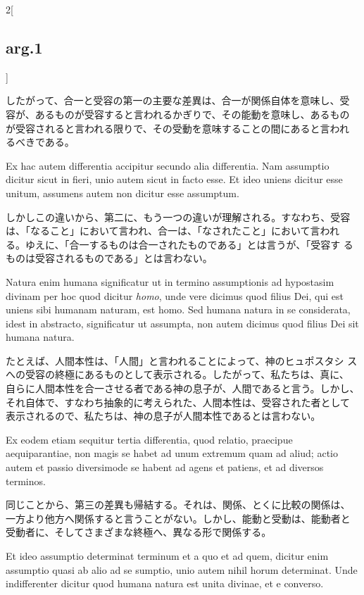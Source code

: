 \documentclass[paper=a4paper,fontsize=10pt,jafontsize=9pt,titlepage]{jlreq}
\begin{document}
\begin{paracol}{2}[\subsection{arg.1}]
\switchcolumn

したがって、合一と受容の第一の主要な差異は、合一が関係自体を意味し、受
容が、あるものが受容すると言われるかぎりで、その能動を意味し、あるもの
が受容されると言われる限りで、その受動を意味することの間にあると言われ
るべきである。

\switchcolumn*

Ex hac autem differentia accipitur secundo alia differentia. Nam
assumptio dicitur sicut in fieri, unio autem sicut in facto esse. Et
ideo uniens dicitur esse unitum, assumens autem non dicitur esse
assumptum.

\switchcolumn

しかしこの違いから、第二に、もう一つの違いが理解される。すなわち、受容
は、「なること」において言われ、合一は、「なされたこと」において言われ
る。ゆえに、「合一するものは合一されたものである」とは言うが、「受容す
るものは受容されるものである」とは言わない。

\switchcolumn*

Natura enim humana significatur ut in termino assumptionis ad
hypostasim divinam per hoc quod dicitur {\itshape homo}, unde vere
dicimus quod filius Dei, qui est uniens sibi humanam naturam, est
homo. Sed humana natura in se considerata, idest in abstracto,
significatur ut assumpta, non autem dicimus quod filius Dei sit humana
natura.

\switchcolumn

たとえば、人間本性は、「人間」と言われることによって、神のヒュポスタシ
スへの受容の終極にあるものとして表示される。したがって、私たちは、真に、
自らに人間本性を合一させる者である神の息子が、人間であると言う。しかし、
それ自体で、すなわち抽象的に考えられた、人間本性は、受容された者として
表示されるので、私たちは、神の息子が人間本性であるとは言わない。

\switchcolumn*

Ex eodem etiam sequitur tertia differentia, quod relatio, praecipue
aequiparantiae, non magis se habet ad unum extremum quam ad aliud;
actio autem et passio diversimode se habent ad agens et patiens, et ad
diversos terminos.

\switchcolumn

同じことから、第三の差異も帰結する。それは、関係、とくに比較の関係は、
一方より他方へ関係すると言うことがない。しかし、能動と受動は、能動者と
受動者に、そしてさまざまな終極へ、異なる形で関係する。

\switchcolumn*

Et ideo assumptio determinat terminum et a quo et ad quem, dicitur
enim assumptio quasi ab alio ad se sumptio, unio autem nihil horum
determinat. Unde indifferenter dicitur quod humana natura est unita
divinae, et e converso.


\end{paracol}
\end{document}
